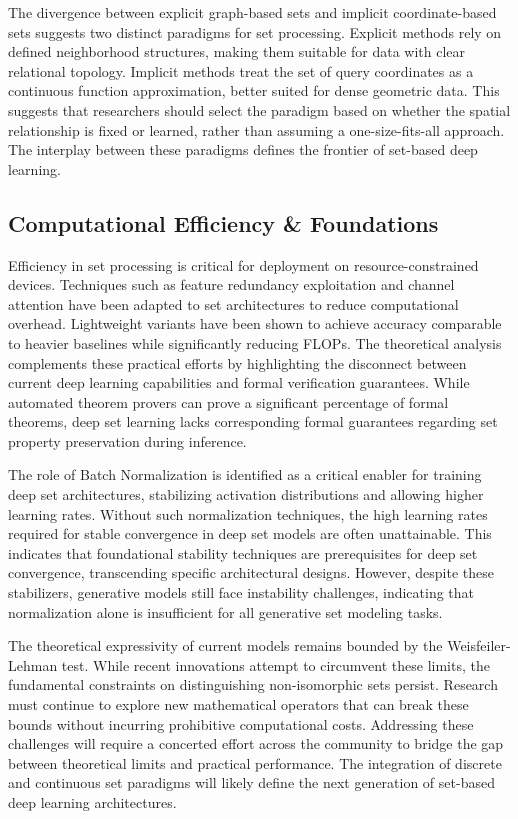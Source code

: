 \documentclass{article}
\begin{document}
The divergence between explicit graph-based sets and implicit coordinate-based sets suggests two distinct paradigms for set processing. Explicit methods rely on defined neighborhood structures, making them suitable for data with clear relational topology. Implicit methods treat the set of query coordinates as a continuous function approximation, better suited for dense geometric data. This suggests that researchers should select the paradigm based on whether the spatial relationship is fixed or learned, rather than assuming a one-size-fits-all approach. The interplay between these paradigms defines the frontier of set-based deep learning.

\subsection{Computational Efficiency \& Foundations}

\label{sec:computational_efficiency_foundations}

Efficiency in set processing is critical for deployment on resource-constrained devices. Techniques such as feature redundancy exploitation and channel attention have been adapted to set architectures to reduce computational overhead. Lightweight variants have been shown to achieve accuracy comparable to heavier baselines while significantly reducing FLOPs. The theoretical analysis complements these practical efforts by highlighting the disconnect between current deep learning capabilities and formal verification guarantees. While automated theorem provers can prove a significant percentage of formal theorems, deep set learning lacks corresponding formal guarantees regarding set property preservation during inference.

The role of Batch Normalization is identified as a critical enabler for training deep set architectures, stabilizing activation distributions and allowing higher learning rates. Without such normalization techniques, the high learning rates required for stable convergence in deep set models are often unattainable. This indicates that foundational stability techniques are prerequisites for deep set convergence, transcending specific architectural designs. However, despite these stabilizers, generative models still face instability challenges, indicating that normalization alone is insufficient for all generative set modeling tasks.

The theoretical expressivity of current models remains bounded by the Weisfeiler-Lehman test. While recent innovations attempt to circumvent these limits, the fundamental constraints on distinguishing non-isomorphic sets persist. Research must continue to explore new mathematical operators that can break these bounds without incurring prohibitive computational costs. Addressing these challenges will require a concerted effort across the community to bridge the gap between theoretical limits and practical performance. The integration of discrete and continuous set paradigms will likely define the next generation of set-based deep learning architectures.
\end{document}
